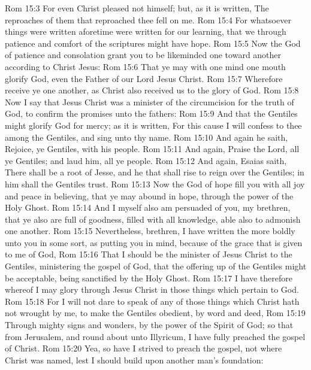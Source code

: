 \vs Rom 15:3 For even Christ pleased not himself; but, as it is written, The reproaches of them that reproached thee fell on me.
\vs Rom 15:4 For whatsoever things were written aforetime were written for our learning, that we through patience and comfort of the scriptures might have hope.
\vs Rom 15:5 Now the God of patience and consolation grant you to be likeminded one toward another according to Christ Jesus:
\vs Rom 15:6 That ye may with one mind  one mouth glorify God, even the Father of our Lord Jesus Christ.
\vs Rom 15:7 Wherefore receive ye one another, as Christ also received us to the glory of God.
\vs Rom 15:8 Now I say that Jesus Christ was a minister of the circumcision for the truth of God, to confirm the promises  unto the fathers:
\vs Rom 15:9 And that the Gentiles might glorify God for  mercy; as it is written, For this cause I will confess to thee among the Gentiles, and sing unto thy name.
\vs Rom 15:10 And again he saith, Rejoice, ye Gentiles, with his people.
\vs Rom 15:11 And again, Praise the Lord, all ye Gentiles; and laud him, all ye people.
\vs Rom 15:12 And again, Esaias saith, There shall be a root of Jesse, and he that shall rise to reign over the Gentiles; in him shall the Gentiles trust.
\vs Rom 15:13 Now the God of hope fill you with all joy and peace in believing, that ye may abound in hope, through the power of the Holy Ghost.
\vs Rom 15:14 And I myself also am persuaded of you, my brethren, that ye also are full of goodness, filled with all knowledge, able also to admonish one another.
\vs Rom 15:15 Nevertheless, brethren, I have written the more boldly unto you in some sort, as putting you in mind, because of the grace that is given to me of God,
\vs Rom 15:16 That I should be the minister of Jesus Christ to the Gentiles, ministering the gospel of God, that the offering up of the Gentiles might be acceptable, being sanctified by the Holy Ghost.
\vs Rom 15:17 I have therefore whereof I may glory through Jesus Christ in those things which pertain to God.
\vs Rom 15:18 For I will not dare to speak of any of those things which Christ hath not wrought by me, to make the Gentiles obedient, by word and deed,
\vs Rom 15:19 Through mighty signs and wonders, by the power of the Spirit of God; so that from Jerusalem, and round about unto Illyricum, I have fully preached the gospel of Christ.
\vs Rom 15:20 Yea, so have I strived to preach the gospel, not where Christ was named, lest I should build upon another man's foundation:
